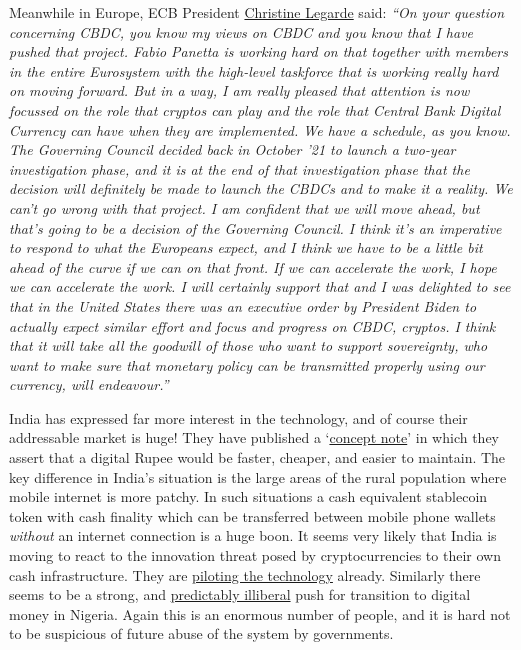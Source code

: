 Meanwhile in Europe, ECB President \href{https://www.ecb.europa.eu/press/pressconf/2022/html/ecb.is220310~1bc8c1b1ca.en.html#qa}{Christine Legarde} said: \textit{``On your question concerning CBDC, you know my views on CBDC and you know that I have pushed that project. Fabio Panetta is working hard on that together with members in the entire Eurosystem with the high-level taskforce that is working really hard on moving forward. But in a way, I am really pleased that attention is now focussed on the role that cryptos can play and the role that Central Bank Digital Currency can have when they are implemented. We have a schedule, as you know. The Governing Council decided back in October '21 to launch a two-year investigation phase, and it is at the end of that investigation phase that the decision will definitely be made to launch the CBDCs and to make it a reality. We can't go wrong with that project. I am confident that we will move ahead, but that's going to be a decision of the Governing Council. I think it's an imperative to respond to what the Europeans expect, and I think we have to be a little bit ahead of the curve if we can on that front. If we can accelerate the work, I hope we can accelerate the work. I will certainly support that and I was delighted to see that in the United States there was an executive order by President Biden to actually expect similar effort and focus and progress on CBDC, cryptos. I think that it will take all the goodwill of those who want to support sovereignty, who want to make sure that monetary policy can be transmitted properly using our currency, will endeavour.''}\par
India has expressed far more interest in the technology, and of course their addressable market is huge! They have published a  `\href{https://twitter.com/RBI/status/1578329048446828544?}{concept note}' in which they assert that a digital Rupee would be faster, cheaper, and easier to maintain. The key difference in India's situation is the large areas of the rural population where mobile internet is more patchy. In such situations a cash equivalent stablecoin token with cash finality which can be transferred between mobile phone wallets \textit{without} an internet connection is a huge boon. It seems very likely that India is moving to react to the innovation threat posed by cryptocurrencies to their own cash infrastructure. They are \href{https://www.reuters.com/article/idUSKBN2RQ0WO}{piloting the technology} already. Similarly there seems to be a strong, and \href{https://www.bloomberg.com/news/articles/2022-12-06/nigeria-limits-cash-transactions-to-push-enaira-and-other-payments}{predictably illiberal} push for transition to digital money in Nigeria. Again this is an enormous number of people, and it is hard not to be suspicious of future abuse of the system by governments.\par
